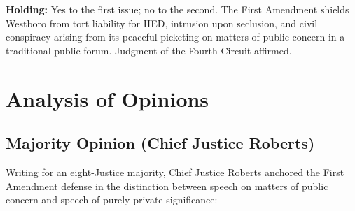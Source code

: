 \documentclass[12pt]{article}
\begin{document}
\textbf{Holding:} Yes to the first issue; no to the second. The First Amendment shields Westboro from tort liability for IIED, intrusion upon seclusion, and civil conspiracy arising from its peaceful picketing on matters of public concern in a traditional public forum. Judgment of the Fourth Circuit affirmed.

\section{Analysis of Opinions}
\subsection{Majority Opinion (Chief Justice Roberts)}

Writing for an eight-Justice majority, Chief Justice Roberts anchored the First Amendment defense in the distinction between speech on matters of public concern and speech of purely private significance:
\end{document}
